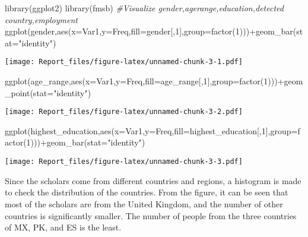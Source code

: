 \documentclass[
]{article}
\newenvironment{Shaded}{\begin{snugshade}}{\end{snugshade}}
\newcommand{\AttributeTok}[1]{\textcolor[rgb]{0.77,0.63,0.00}{#1}}
\newcommand{\CommentTok}[1]{\textcolor[rgb]{0.56,0.35,0.01}{\textit{#1}}}
\newcommand{\DecValTok}[1]{\textcolor[rgb]{0.00,0.00,0.81}{#1}}
\newcommand{\FunctionTok}[1]{\textcolor[rgb]{0.00,0.00,0.00}{#1}}
\newcommand{\NormalTok}[1]{#1}
\newcommand{\SpecialCharTok}[1]{\textcolor[rgb]{0.00,0.00,0.00}{#1}}
\newcommand{\StringTok}[1]{\textcolor[rgb]{0.31,0.60,0.02}{#1}}
\begin{document}
\begin{Shaded}
\begin{Highlighting}[]
\FunctionTok{library}\NormalTok{(ggplot2)}
\FunctionTok{library}\NormalTok{(fmsb)}
\CommentTok{\#Visualize gender,agerange,education,detected country,employment}
\FunctionTok{ggplot}\NormalTok{(gender,}\FunctionTok{aes}\NormalTok{(}\AttributeTok{x=}\NormalTok{Var1,}\AttributeTok{y=}\NormalTok{Freq,}\AttributeTok{fill=}\NormalTok{gender[,}\DecValTok{1}\NormalTok{],}\AttributeTok{group=}\FunctionTok{factor}\NormalTok{(}\DecValTok{1}\NormalTok{)))}\SpecialCharTok{+}\FunctionTok{geom\_bar}\NormalTok{(}\AttributeTok{stat=}\StringTok{"identity"}\NormalTok{)}
\end{Highlighting}
\end{Shaded}

\texttt{[image: Report\_files/figure-latex/unnamed-chunk-3-1.pdf]}

\begin{Shaded}
\begin{Highlighting}[]
\FunctionTok{ggplot}\NormalTok{(age\_range,}\FunctionTok{aes}\NormalTok{(}\AttributeTok{x=}\NormalTok{Var1,}\AttributeTok{y=}\NormalTok{Freq,}\AttributeTok{fill=}\NormalTok{age\_range[,}\DecValTok{1}\NormalTok{],}\AttributeTok{group=}\FunctionTok{factor}\NormalTok{(}\DecValTok{1}\NormalTok{)))}\SpecialCharTok{+}\FunctionTok{geom\_point}\NormalTok{(}\AttributeTok{stat=}\StringTok{"identity"}\NormalTok{)}
\end{Highlighting}
\end{Shaded}

\texttt{[image: Report\_files/figure-latex/unnamed-chunk-3-2.pdf]}

\begin{Shaded}
\begin{Highlighting}[]
\FunctionTok{ggplot}\NormalTok{(highest\_education,}\FunctionTok{aes}\NormalTok{(}\AttributeTok{x=}\NormalTok{Var1,}\AttributeTok{y=}\NormalTok{Freq,}\AttributeTok{fill=}\NormalTok{highest\_education[,}\DecValTok{1}\NormalTok{],}\AttributeTok{group=}\FunctionTok{factor}\NormalTok{(}\DecValTok{1}\NormalTok{)))}\SpecialCharTok{+}\FunctionTok{geom\_bar}\NormalTok{(}\AttributeTok{stat=}\StringTok{"identity"}\NormalTok{)}
\end{Highlighting}
\end{Shaded}

\texttt{[image: Report\_files/figure-latex/unnamed-chunk-3-3.pdf]}

Since the scholars come from different countries and regions, a
histogram is made to check the distribution of the countries. From the
figure, it can be seen that most of the scholars are from the United
Kingdom, and the number of other countries is significantly smaller. The
number of people from the three countries of MX, PK, and ES is the
least.
\end{document}
